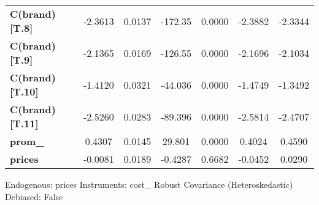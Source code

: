 \begin{center}
\begin{tabular}{lcccccc}
\textbf{C(brand)[T.8]}  &      -2.3613       &       0.0137       &     -172.35     &      0.0000      &      -2.3882      &      -2.3344       \\
\textbf{C(brand)[T.9]}  &      -2.1365       &       0.0169       &     -126.55     &      0.0000      &      -2.1696      &      -2.1034       \\
\textbf{C(brand)[T.10]} &      -1.4120       &       0.0321       &     -44.036     &      0.0000      &      -1.4749      &      -1.3492       \\
\textbf{C(brand)[T.11]} &      -2.5260       &       0.0283       &     -89.396     &      0.0000      &      -2.5814      &      -2.4707       \\
\textbf{prom\_}         &       0.4307       &       0.0145       &      29.801     &      0.0000      &       0.4024      &       0.4590       \\
\textbf{prices}         &      -0.0081       &       0.0189       &     -0.4287     &      0.6682      &      -0.0452      &       0.0290       \\
\bottomrule
\end{tabular}
\end{center}

Endogenous: prices \newline
 Instruments: cost\_ \newline
 Robust Covariance (Heteroskedastic) \newline
 Debiased: False

